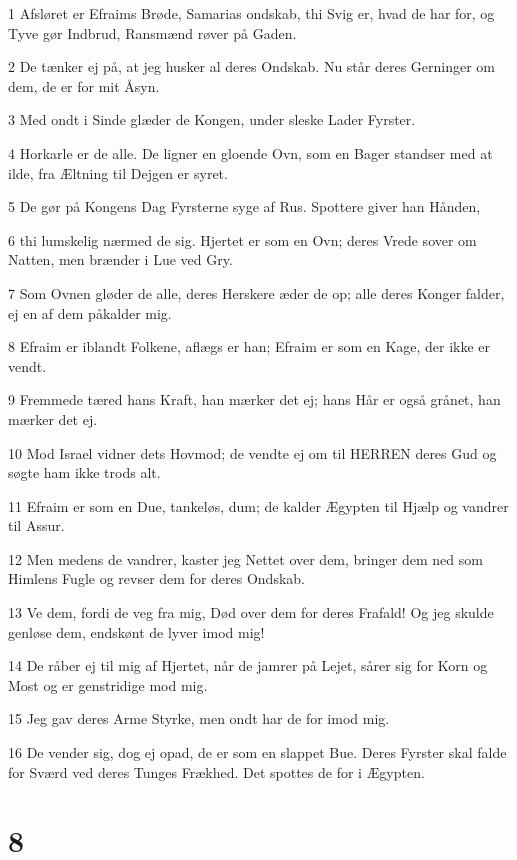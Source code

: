 \par 1 Afsløret er Efraims Brøde, Samarias ondskab, thi Svig er, hvad de har for, og Tyve gør Indbrud, Ransmænd røver på Gaden.
\par 2 De tænker ej på, at jeg husker al deres Ondskab. Nu står deres Gerninger om dem, de er for mit Åsyn.
\par 3 Med ondt i Sinde glæder de Kongen, under sleske Lader Fyrster.
\par 4 Horkarle er de alle. De ligner en gloende Ovn, som en Bager standser med at ilde, fra Æltning til Dejgen er syret.
\par 5 De gør på Kongens Dag Fyrsterne syge af Rus. Spottere giver han Hånden,
\par 6 thi lumskelig nærmed de sig. Hjertet er som en Ovn; deres Vrede sover om Natten, men brænder i Lue ved Gry.
\par 7 Som Ovnen gløder de alle, deres Herskere æder de op; alle deres Konger falder, ej en af dem påkalder mig.
\par 8 Efraim er iblandt Folkene, aflægs er han; Efraim er som en Kage, der ikke er vendt.
\par 9 Fremmede tæred hans Kraft, han mærker det ej; hans Hår er også grånet, han mærker det ej.
\par 10 Mod Israel vidner dets Hovmod; de vendte ej om til HERREN deres Gud og søgte ham ikke trods alt.
\par 11 Efraim er som en Due, tankeløs, dum; de kalder Ægypten til Hjælp og vandrer til Assur.
\par 12 Men medens de vandrer, kaster jeg Nettet over dem, bringer dem ned som Himlens Fugle og revser dem for deres Ondskab.
\par 13 Ve dem, fordi de veg fra mig, Død over dem for deres Frafald! Og jeg skulde genløse dem, endskønt de lyver imod mig!
\par 14 De råber ej til mig af Hjertet, når de jamrer på Lejet, sårer sig for Korn og Most og er genstridige mod mig.
\par 15 Jeg gav deres Arme Styrke, men ondt har de for imod mig.
\par 16 De vender sig, dog ej opad, de er som en slappet Bue. Deres Fyrster skal falde for Sværd ved deres Tunges Frækhed. Det spottes de for i Ægypten.

\chapter{8}

